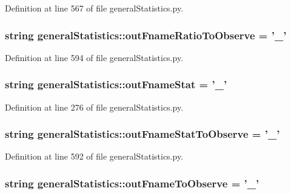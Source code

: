 \-Definition at line 567 of file general\-Statistics.\-py.

\hypertarget{namespacegeneral_statistics_a208835711455a9a3ef08807b9d561de5}{
\subsubsection[{out\-Fname\-Ratio\-To\-Observe}]{\setlength{\rightskip}{0pt plus 5cm}string {\bf general\-Statistics\-::out\-Fname\-Ratio\-To\-Observe} = '{\bf \-\_\-}'}}\label{namespacegeneral_statistics_a208835711455a9a3ef08807b9d561de5}


\-Definition at line 594 of file general\-Statistics.\-py.

\hypertarget{namespacegeneral_statistics_a3395f09c196abc5195fcdd3d4e04b564}{
\subsubsection[{out\-Fname\-Stat}]{\setlength{\rightskip}{0pt plus 5cm}string {\bf general\-Statistics\-::out\-Fname\-Stat} = '{\bf \-\_\-}'}}\label{namespacegeneral_statistics_a3395f09c196abc5195fcdd3d4e04b564}


\-Definition at line 276 of file general\-Statistics.\-py.

\hypertarget{namespacegeneral_statistics_aa2ed0468341b598ff719c6a531cd44c1}{
\subsubsection[{out\-Fname\-Stat\-To\-Observe}]{\setlength{\rightskip}{0pt plus 5cm}string {\bf general\-Statistics\-::out\-Fname\-Stat\-To\-Observe} = '{\bf \-\_\-}'}}\label{namespacegeneral_statistics_aa2ed0468341b598ff719c6a531cd44c1}


\-Definition at line 592 of file general\-Statistics.\-py.

\hypertarget{namespacegeneral_statistics_a26991f5cc2efbf935f14d32cea1991fc}{
\subsubsection[{out\-Fname\-To\-Observe}]{\setlength{\rightskip}{0pt plus 5cm}string {\bf general\-Statistics\-::out\-Fname\-To\-Observe} = '{\bf \-\_\-}'}}\label{namespacegeneral_statistics_a26991f5cc2efbf935f14d32cea1991fc}


